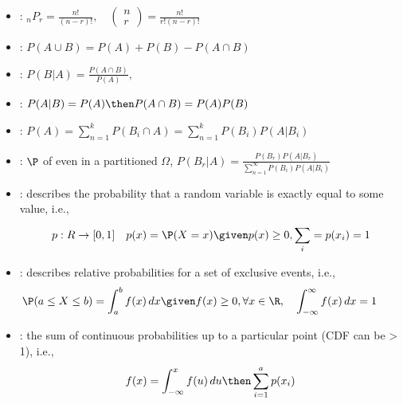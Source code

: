 \documentclass[basic]{nosvagor-notes}
\begin{document}


  \begin{itemize}
    \item {}: \(\displaystyle  {}_nP_r = \frac{n!}{(n-r)!}, \quad
      \begin{pmatrix} n \\ r \end{pmatrix} = \frac{n!}{r!(n-r)!}
      \)

    \item {}: \(P(A \cup B) = P(A) + P(B) - P(A \cap B)\)

    \item {}: \(\displaystyle P(B|A) = \frac{P(A \cap
      B)}{P(A)},\)

    \item {}: \(P(A|B) = P(A) \then P(A \cap B) = P(A)P(B)\)

    \item {}: \(\displaystyle P(A) = \sum_{n=1}^{k} P(B_i
      \cap A) = \sum_{n=1}^{k} P(B_i)P(A|B_i)\)

    \item {}: \(\P\) of even in a partitioned \(\Omega\), \(\displaystyle  P(B_r|A) = \frac{P(B_r)P(A|B_r)}{\sum_{n=1}^{\infty} P(B_i)P(A|B_i)}\)

  \end{itemize}

  \hrulefill

  \begin{itemize}
    \item {}: describes the probability that a
       random variable is exactly equal to some value, i.e.,
      \[%
        p : R \to [0,1] \quad  p(x) = \P(X = x) \given p(x) \geq 0, \sum_{i}^{} = p(x_i) = 1
      \]%

    \item {}: describes relative probabilities
      for a set of exclusive  events, i.e.,
      \[%
        \hspace{-2em}
        \P(a \leq X \leq b) = \int_{a}^{b} f(x)\,dx \given
        f(x) \geq 0, \forall x \in \R, \quad
        \displaystyle \int_{-\infty}^{\infty} f(x)\,dx = 1
      \]%

    \item {}: the sum of continuous probabilities
      up to a particular point (CDF can be > 1), i.e.,
      \[%
        f(x) = \int_{-\infty}^{x} f(u)\, du \then \sum_{i=1}^{a} p(x_i)
      \]%

  \end{itemize}
\end{document}
